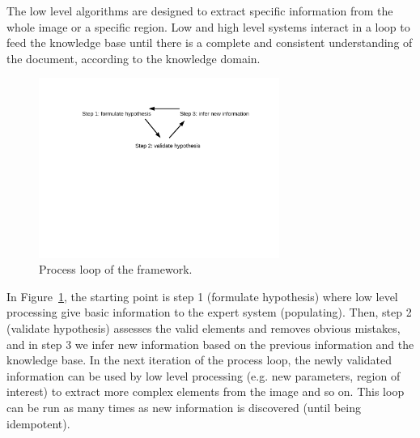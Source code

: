 The low level algorithms are designed to extract specific information from the whole image or a specific region.
Low and high level systems interact in a loop to feed the knowledge base until there is a complete and consistent understanding of the document, according to the knowledge domain. 


 \begin{figure}[!ht]  %
   \centering
  \includegraphics[trim= 140px 350px 100px 95px, clip, width=0.7\textwidth]{process_loop.pdf}
  \caption[Process loop of the knowledge-driven system]{Process loop of the framework.}
  \label{fig:kn:process_loop}
 \end{figure}

In Figure~\ref{fig:kn:process_loop}, the starting point is step 1 (formulate hypothesis) where low level processing give basic information to the expert system (populating).
Then, step 2 (validate hypothesis) assesses the valid elements and removes obvious mistakes, and in step 3 we infer new information based on the previous information and the knowledge base.
In the next iteration of the process loop, the newly validated information can be used by low level processing (e.g. new parameters, region of interest) to extract more complex elements from the image and so on.
This loop can be run as many times as new information is discovered (until being idempotent).




